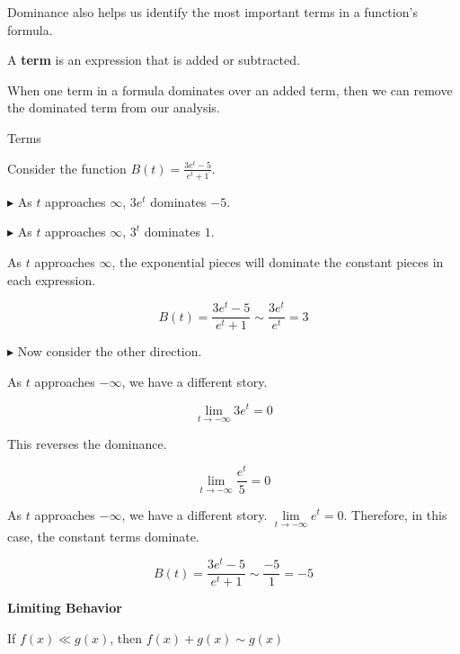 \documentclass{ximera}
\begin{document}
Dominance also helps us identify the most important terms in a function's formula.


A \textbf{term} is an expression that is added or subtracted.

When one term in a formula dominates over an added term, then we can remove the dominated term from our analysis. 






\begin{example} Terms


Consider the function $B(t) = \frac{3e^t - 5}{e^t + 1}$. 


$\blacktriangleright$ As $t$ approaches $\infty$, $3e^t$ dominates $-5$. 

$\blacktriangleright$ As $t$ approaches $\infty$, $3^t$ dominates $1$. 




As $t$ approaches $\infty$, the exponential pieces will dominate the constant pieces in each expression.  

\[   B(t) = \frac{3e^t - 5}{e^t + 1} \sim \frac{3 e^t}{e^t} = 3   \]




\textbf{\textcolor{blue!55!black}{$\blacktriangleright$}} Now consider the other direction. 


As $t$ approaches $-\infty$, we have a different story.   



\[   \lim\limits_{t \to -\infty} 3 e^t  = 0  \]


This reverses the dominance.


\[   \lim\limits_{t \to -\infty} \frac{e^t}{5} = 0   \]



As $t$ approaches $-\infty$, we have a different story.  $\lim\limits_{t \to -\infty} e^t = 0$. Therefore, in this case, the constant terms dominate.


\[   B(t) = \frac{3e^t - 5}{e^t + 1} \sim \frac{-5}{1} = -5   \]








\end{example}




\begin{idea} \textbf{\textcolor{blue!55!black}{Limiting Behavior}}



If $f(x) \ll g(x)$, then $f(x) + g(x) \sim g(x)$



\end{idea}
\end{document}
